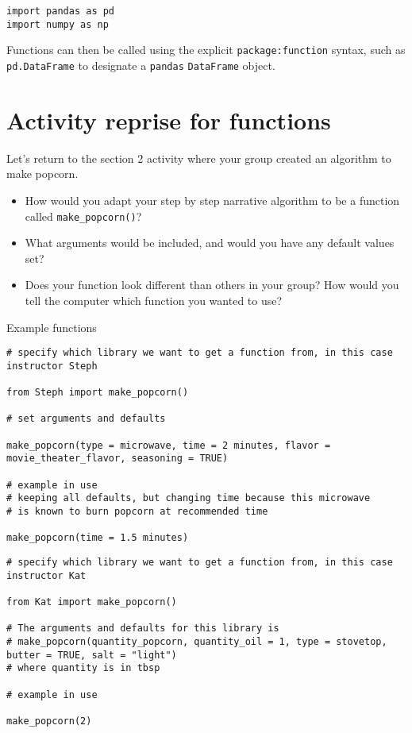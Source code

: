 \documentclass[
]{book}
\providecommand{\tightlist}{%
  \setlength{\itemsep}{0pt}\setlength{\parskip}{0pt}}
\begin{document}
\begin{verbatim}
import pandas as pd
import numpy as np
\end{verbatim}

Functions can then be called using the explicit \texttt{package:function} syntax, such as \texttt{pd.DataFrame} to designate a \texttt{pandas} \texttt{DataFrame} object.

\section{Activity reprise for functions}\label{activity-reprise-for-functions}

Let's return to the section 2 activity where your group created an algorithm to make popcorn.

\begin{itemize}
\tightlist
\item
  How would you adapt your step by step narrative algorithm to be a function called \texttt{make\_popcorn()}?
\item
  What arguments would be included, and would you have any default values set?
\item
  Does your function look different than others in your group? How would you tell the computer which function you wanted to use?
\end{itemize}

Example functions

\begin{verbatim}
# specify which library we want to get a function from, in this case instructor Steph

from Steph import make_popcorn()

# set arguments and defaults

make_popcorn(type = microwave, time = 2 minutes, flavor = movie_theater_flavor, seasoning = TRUE)

# example in use
# keeping all defaults, but changing time because this microwave 
# is known to burn popcorn at recommended time

make_popcorn(time = 1.5 minutes)
\end{verbatim}

\begin{verbatim}
# specify which library we want to get a function from, in this case instructor Kat

from Kat import make_popcorn()

# The arguments and defaults for this library is
# make_popcorn(quantity_popcorn, quantity_oil = 1, type = stovetop, butter = TRUE, salt = "light")
# where quantity is in tbsp

# example in use

make_popcorn(2)
\end{verbatim}
\end{document}
